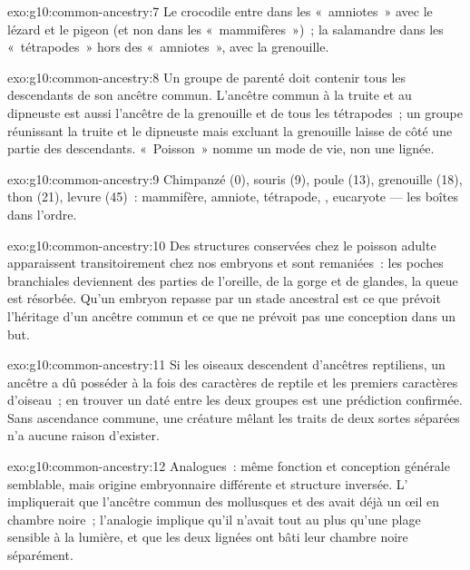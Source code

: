 \begin{solution}{exo:g10:common-ancestry:7}
Le crocodile entre dans les «~amniotes~» avec le lézard et le pigeon
(et non dans les «~mammifères~»)~; la salamandre dans les
«~tétrapodes~» hors des «~amniotes~», avec la grenouille.
\end{solution}

\begin{solution}{exo:g10:common-ancestry:8}
Un groupe de parenté doit contenir tous les descendants de son ancêtre
commun. L'ancêtre commun à la truite et au dipneuste est aussi
l'ancêtre de la grenouille et de tous les tétrapodes~; un groupe
réunissant la truite et le dipneuste mais excluant la grenouille laisse
de côté une partie des descendants. «~Poisson~» nomme un mode de vie,
non une lignée.
\end{solution}

\begin{solution}{exo:g10:common-ancestry:9}
Chimpanzé (0), souris (9), poule (13), grenouille (18), thon (21),
levure (45)~: mammifère, amniote, tétrapode, , eucaryote --- les
boîtes dans l'ordre.
\end{solution}

\begin{solution}{exo:g10:common-ancestry:10}
Des structures conservées chez le poisson adulte apparaissent
transitoirement chez nos embryons et sont remaniées~: les poches
branchiales deviennent des parties de l'oreille, de la gorge et de
glandes, la queue est résorbée. Qu'un embryon repasse par un stade
ancestral est ce que prévoit l'héritage d'un ancêtre commun et ce que
ne prévoit pas une conception dans un but.
\end{solution}

\begin{solution}{exo:g10:common-ancestry:11}
Si les oiseaux descendent d'ancêtres reptiliens, un ancêtre a dû
posséder à la fois des caractères de reptile et les premiers caractères
d'oiseau~; en trouver un daté entre les deux groupes est une prédiction
confirmée. Sans ascendance commune, une créature mêlant les traits de
deux sortes séparées n'a aucune raison d'exister.
\end{solution}

\begin{solution}{exo:g10:common-ancestry:12}
Analogues~: même fonction et conception générale semblable, mais
origine embryonnaire différente et structure inversée. L'
impliquerait que l'ancêtre commun des mollusques et des  avait
déjà un œil en chambre noire~; l'analogie implique qu'il n'avait tout
au plus qu'une plage sensible à la lumière, et que les deux lignées ont
bâti leur chambre noire séparément.
\end{solution}

